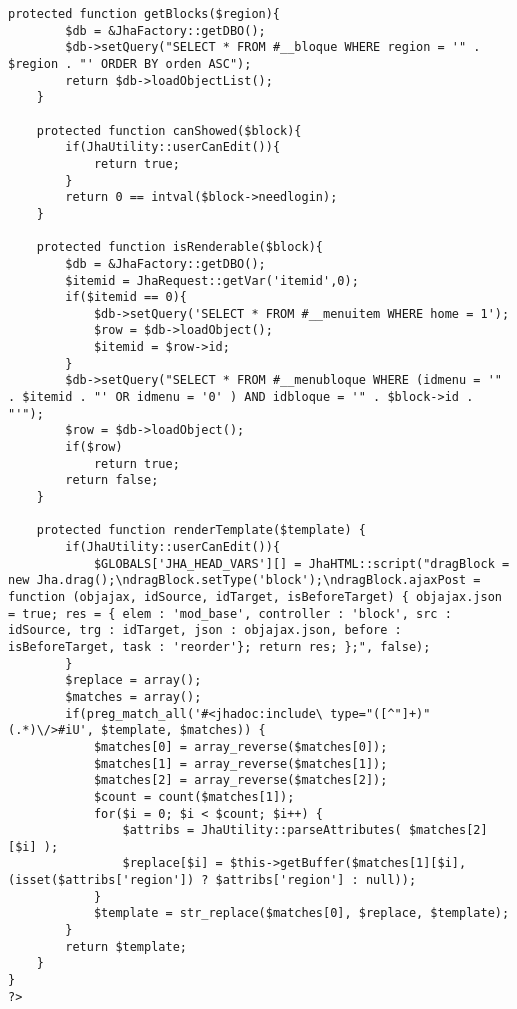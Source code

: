 \begin{lstlisting}[label=jha_renderer,caption=Renderizador JhaRenderer.]
	protected function getBlocks($region){
		$db = &JhaFactory::getDBO();
        $db->setQuery("SELECT * FROM #__bloque WHERE region = '" . $region . "' ORDER BY orden ASC");
        return $db->loadObjectList();
	}
	
	protected function canShowed($block){
		if(JhaUtility::userCanEdit()){
			return true;
		}
		return 0 == intval($block->needlogin);
	}
	
	protected function isRenderable($block){
		$db = &JhaFactory::getDBO();
        $itemid = JhaRequest::getVar('itemid',0);
        if($itemid == 0){
            $db->setQuery('SELECT * FROM #__menuitem WHERE home = 1');
            $row = $db->loadObject();
            $itemid = $row->id;
        }
        $db->setQuery("SELECT * FROM #__menubloque WHERE (idmenu = '" . $itemid . "' OR idmenu = '0' ) AND idbloque = '" . $block->id . "'");
        $row = $db->loadObject();
        if($row)
            return true;
        return false;
	}
	
	protected function renderTemplate($template) {
        if(JhaUtility::userCanEdit()){
        	$GLOBALS['JHA_HEAD_VARS'][] = JhaHTML::script("dragBlock = new Jha.drag();\ndragBlock.setType('block');\ndragBlock.ajaxPost = function (objajax, idSource, idTarget, isBeforeTarget) { objajax.json = true; res = { elem : 'mod_base', controller : 'block', src : idSource, trg : idTarget, json : objajax.json, before : isBeforeTarget, task : 'reorder'}; return res; };", false);
        }
		$replace = array();
        $matches = array();
        if(preg_match_all('#<jhadoc:include\ type="([^"]+)" (.*)\/>#iU', $template, $matches)) {
            $matches[0] = array_reverse($matches[0]);
            $matches[1] = array_reverse($matches[1]);
            $matches[2] = array_reverse($matches[2]);
            $count = count($matches[1]);
            for($i = 0; $i < $count; $i++) {
                $attribs = JhaUtility::parseAttributes( $matches[2][$i] );
                $replace[$i] = $this->getBuffer($matches[1][$i], (isset($attribs['region']) ? $attribs['region'] : null));
            }
            $template = str_replace($matches[0], $replace, $template);
        }
        return $template;
	} 
}
?>
\end{lstlisting}
